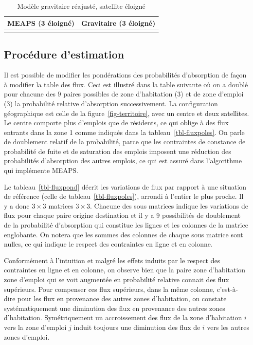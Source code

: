\documentclass[
  10pt,
  a4paper,
  numbers=noendperiod,
  DIV=9]{scrreprt}
\begin{document}
\hypertarget{tbl-fluxgrav3}{}
\begin{longtable}{cc}
\caption{\label{tbl-fluxgrav3}Modèle gravitaire réajusté, satellite éloigné }\tabularnewline

\toprule
MEAPS (3 éloigné) & Gravitaire (3 éloigné) \\ 
\midrule
 &  \\ 
\bottomrule
\end{longtable}

\hypertarget{sec-estimation}{%
\subsection{Procédure d'estimation}\label{sec-estimation}}

Il est possible de modifier les pondérations des probabilités
d'absorption de façon à modifier la table des flux. Ceci est illustré
dans la table suivante où on a doublé pour chacune des 9 paires
possibles de zone d'habitation (3) et de zone d'emploi (3) la
probabilité relative d'absorption successivement. La configuration
géographique est celle de la figure~\ref{fig-territoire}, avec un centre
et deux satellites. Le centre comporte plus d'emplois que de résidents,
ce qui oblige à des flux entrants dans la zone 1 comme indiqués dans la
tableau~\ref{tbl-fluxpoles}. On parle de doublement relatif de la
probabilité, parce que les contraintes de constance de probabilité de
fuite et de saturation des emplois imposent une réduction des
probabilités d'absorption des autres emplois, ce qui est assuré dans
l'algorithme qui implémente MEAPS.

Le tableau~\ref{tbl-fluxpond} décrit les variations de flux par rapport
à une situation de référence (celle de tableau~\ref{tbl-fluxpoles}),
arrondi à l'entier le plus proche. Il y a donc \(3 \times 3\) matrices
\(3 \times 3\). Chacune des sous matrices indique les variations de flux
pour chaque paire origine destination et il y a 9 possibilités de
doublement de la probabilité d'absorption qui constitue les lignes et
les colonnes de la matrice englobante. On notera que les sommes des
colonnes de chaque sous matrice sont nulles, ce qui indique le respect
des contraintes en ligne et en colonne.

Conformément à l'intuition et malgré les effets induits par le respect
des contraintes en ligne et en colonne, on observe bien que la paire
zone d'habitation zone d'emploi qui se voit augmentée en probabilité
relative connait des flux supérieurs. Pour compenser ces flux
supérieurs, dans la même colonne, c'est-à-dire pour les flux en
provenance des autres zones d'habitation, on constate systématiquement
une diminution des flux en provenance des autres zones d'habitation.
Symétriquement un accroissement des flux de la zone d'habitation \(i\)
vers la zone d'emploi \(j\) induit toujours une diminution des flux de
\(i\) vers les autres zones d'emploi.
\end{document}
